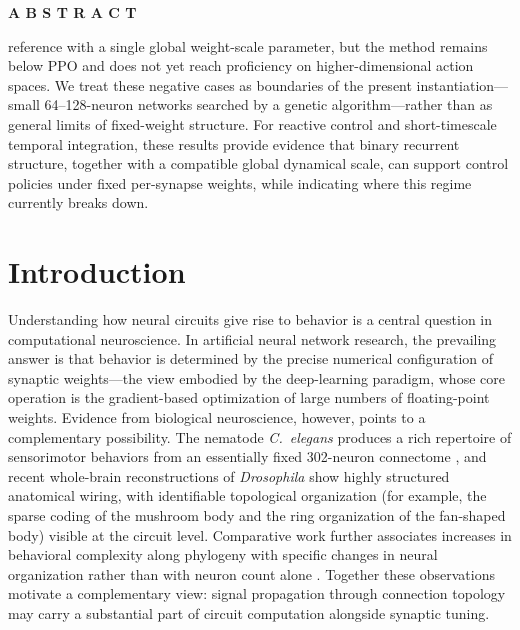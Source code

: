 \documentclass[10pt]{article}
\renewenvironment{abstract}{%
  \vspace{0.15em}
  \begin{center}\small\bfseries A B S T R A C T\end{center}
  \vspace{-0.9em}
  \small\noindent
}{\par\vspace{0.55em}}
\begin{document}
\begin{abstract}
reference with a single global weight-scale parameter, but the method remains
below PPO and does not yet reach proficiency on higher-dimensional action
spaces. We treat these negative cases as boundaries of the present
instantiation---small 64--128-neuron networks searched by a genetic
algorithm---rather than as general limits of fixed-weight structure. For
reactive control and short-timescale temporal integration, these results
provide evidence that binary recurrent structure, together with a compatible
global dynamical scale, can support control policies under fixed per-synapse
weights, while indicating where this regime currently breaks down.
\end{abstract}

\section{Introduction}

Understanding how neural circuits give rise to behavior is a central question
in computational neuroscience. In artificial neural network research, the
prevailing answer is that behavior is determined by the precise numerical
configuration of synaptic weights---the view embodied by the deep-learning
paradigm, whose core operation is the gradient-based optimization of large
numbers of floating-point weights. Evidence from biological neuroscience,
however, points to a complementary possibility. The nematode \textit{C.\ elegans}
produces a rich repertoire of sensorimotor behaviors from an essentially fixed
302-neuron connectome \citep{white1986,cook2019,varshney2011}, and recent
whole-brain reconstructions of \textit{Drosophila} \citep{dorkenwald2024,scheffer2020,eichler2017}
show highly structured anatomical wiring, with identifiable topological
organization (for example, the sparse coding of the mushroom body and the ring
organization of the fan-shaped body) visible at the circuit level. Comparative
work further associates
increases in behavioral complexity along phylogeny with specific changes in
neural organization rather than with neuron count alone \citep{striedter2005,cisek2019}.
Together these observations motivate a complementary view: signal propagation
through connection topology may carry a substantial part of circuit computation
alongside synaptic tuning.
\end{document}
